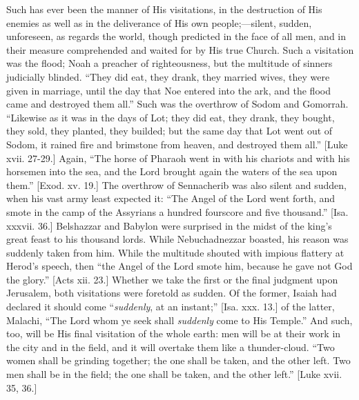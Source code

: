 Such has ever been the manner of His visitations, in the destruction
of His enemies as well as in the deliverance of His own people;—silent,
sudden, unforeseen, as regards the world, though predicted in the face
of all men, and in their measure comprehended and waited for by His true
Church. Such a visitation was the flood; Noah a preacher of
righteousness, but the multitude of sinners judicially blinded.
``They did eat, they drank, they married wives, they were given in
marriage, until the day that Noe entered into the ark, and the flood
came and destroyed them all.'' Such was the overthrow of Sodom and
Gomorrah. ``Likewise as it was in the days of Lot; they did eat,
they drank, they bought, they sold, they planted, they builded; but the
same day that Lot went out of Sodom, it rained fire and brimstone from
heaven, and destroyed them all.'' [Luke xvii. 27-29.] Again,
``The horse of Pharaoh went in with his chariots and with his
horsemen into the sea, and the Lord brought again the waters of the sea
upon them.'' [Exod. xv. 19.] The overthrow of Sennacherib was also
silent and sudden, when his vast army least expected it: ``The Angel
of the Lord went forth, and smote in the camp of the Assyrians a hundred
fourscore and five thousand.'' [Isa. xxxvii. 36.] Belshazzar and
Babylon were surprised in the midst of the king's great feast to his
thousand lords. While Nebuchadnezzar boasted, his reason was suddenly
taken from him. While the multitude shouted with impious flattery at
Herod's speech, then ``the Angel of the Lord smote him, because he
gave not God the glory.'' [Acts xii. 23.] Whether we take the first
or the final judgment upon Jerusalem, both visitations were foretold as
sudden. Of the former, Isaiah had declared it should come ``\emph{suddenly},
at an instant;'' [Isa. xxx. 13.] of the latter, Malachi, ``The
Lord whom ye seek shall \emph{suddenly} come to His Temple.'' And
such, too, will be His final visitation of the whole earth: men will be
at their work in the city and in the field, and it will overtake them
like a thunder-cloud. ``Two women shall be grinding together; the
one shall be taken, and the other left. Two men shall be in the field;
the one shall be taken, and the other left.'' [Luke xvii. 35, 36.]


